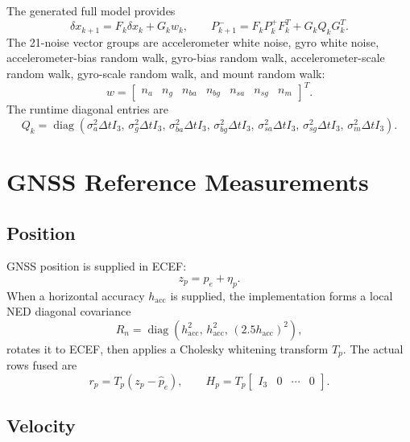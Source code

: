 \documentclass[11pt]{article}
\newcommand{\T}{^{T}}
\newcommand{\dt}{\Delta t}
\begin{document}
The generated full model provides
\begin{equation}
  \delta x_{k+1}=F_k\delta x_k+G_kw_k,
  \qquad
  P_{k+1}^{-}=F_kP_k^{+}F_k\T+G_kQ_kG_k\T .
\end{equation}
The 21-noise vector groups are accelerometer white noise, gyro white noise,
accelerometer-bias random walk, gyro-bias random walk, accelerometer-scale
random walk, gyro-scale random walk, and mount random walk:
\begin{equation}
  w=
  \begin{bmatrix}
  n_a & n_g & n_{ba} & n_{bg} & n_{sa} & n_{sg} & n_m
  \end{bmatrix}\T .
\end{equation}
The runtime diagonal entries are
\begin{equation}
  Q_k=\operatorname{diag}\left(
  \sigma_a^2\dt I_3,\,
  \sigma_g^2\dt I_3,\,
  \sigma_{ba}^2\dt I_3,\,
  \sigma_{bg}^2\dt I_3,\,
  \sigma_{sa}^2\dt I_3,\,
  \sigma_{sg}^2\dt I_3,\,
  \sigma_m^2\dt I_3
  \right).
\end{equation}

\section{GNSS Reference Measurements}

\subsection{Position}

GNSS position is supplied in ECEF:
\begin{equation}
  z_p=p_e+\eta_p .
\end{equation}
When a horizontal accuracy \(h_{\mathrm{acc}}\) is supplied, the implementation
forms a local NED diagonal covariance
\begin{equation}
  R_n=\operatorname{diag}\left(h_{\mathrm{acc}}^2,\,
  h_{\mathrm{acc}}^2,\,(2.5h_{\mathrm{acc}})^2\right),
\end{equation}
rotates it to ECEF, then applies a Cholesky whitening transform \(T_p\). The
actual rows fused are
\begin{equation}
  r_p=T_p(z_p-\hat p_e),\qquad H_p=T_p
  \begin{bmatrix}I_3&0&\cdots&0\end{bmatrix}.
\end{equation}

\subsection{Velocity}
\end{document}
